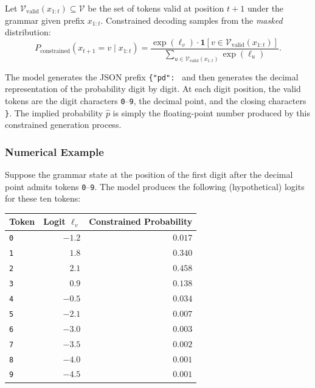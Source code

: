 \begin{context}
Let $\mathcal{V}_{\text{valid}}(x_{1:t}) \subseteq \mathcal{V}$ be the set of tokens valid at position $t+1$ under the grammar given prefix $x_{1:t}$. Constrained decoding samples from the \emph{masked} distribution:
\begin{equation}
  P_{\text{constrained}}(x_{t+1} = v \mid x_{1:t}) = \frac{\exp(\ell_v) \cdot \mathbf{1}[v \in \mathcal{V}_{\text{valid}}(x_{1:t})]}{\sum_{u \in \mathcal{V}_{\text{valid}}(x_{1:t})} \exp(\ell_u)}.
  \label{eq:constrained-softmax}
\end{equation}

The model generates the JSON prefix \texttt{\{"pd": } and then generates the decimal representation of the probability digit by digit. At each digit position, the valid tokens are the digit characters \texttt{0}--\texttt{9}, the decimal point, and the closing characters \texttt{\}}. The implied probability $\hat{p}$ is simply the floating-point number produced by this constrained generation process.

\subsubsection*{Numerical Example}

Suppose the grammar state at the position of the first digit after the decimal point admits tokens \texttt{0}--\texttt{9}. The model produces the following (hypothetical) logits for these ten tokens:

\begin{center}
\begin{tabular}{lrr}
\toprule
Token & Logit $\ell_v$ & Constrained Probability \\
\midrule
\texttt{0} & $-1.2$ & $0.017$ \\
\texttt{1} & $\phantom{-}1.8$ & $0.340$ \\
\texttt{2} & $\phantom{-}2.1$ & $0.458$ \\
\texttt{3} & $\phantom{-}0.9$ & $0.138$ \\
\texttt{4} & $-0.5$ & $0.034$ \\
\texttt{5} & $-2.1$ & $0.007$ \\
\texttt{6} & $-3.0$ & $0.003$ \\
\texttt{7} & $-3.5$ & $0.002$ \\
\texttt{8} & $-4.0$ & $0.001$ \\
\texttt{9} & $-4.5$ & $0.001$ \\
\bottomrule
\end{tabular}
\end{center}


\end{context}
